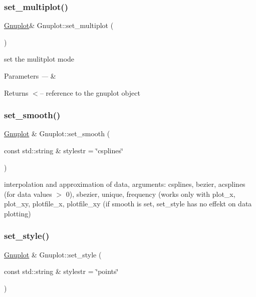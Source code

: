 \subsubsection{\texorpdfstring{set\+\_\+multiplot()}{set\_multiplot()}}
{\footnotesize\ttfamily \mbox{\hyperlink{class_gnuplot}{Gnuplot}}\& Gnuplot\+::set\+\_\+multiplot (\begin{DoxyParamCaption}{ }\end{DoxyParamCaption})\hspace{0.3cm}{\ttfamily [inline]}}

set the mulitplot mode


\begin{DoxyParams}{Parameters}
{\em ---} & \\
\hline
\end{DoxyParams}
\begin{DoxyReturn}{Returns}
$<$-- reference to the gnuplot object 
\end{DoxyReturn}
\mbox{\label{class_gnuplot_aa18386919da2ec4c994f1f9c7195d384}} 
\subsubsection{\texorpdfstring{set\+\_\+smooth()}{set\_smooth()}}
{\footnotesize\ttfamily \mbox{\hyperlink{class_gnuplot}{Gnuplot}} \& Gnuplot\+::set\+\_\+smooth (\begin{DoxyParamCaption}\item[{const std\+::string \&}]{stylestr = {\ttfamily \char`\"{}csplines\char`\"{}} }\end{DoxyParamCaption})}

interpolation and approximation of data, arguments\+: csplines, bezier, acsplines (for data values $>$ 0), sbezier, unique, frequency (works only with plot\+\_\+x, plot\+\_\+xy, plotfile\+\_\+x, plotfile\+\_\+xy (if smooth is set, set\+\_\+style has no effekt on data plotting) \mbox{\label{class_gnuplot_acfdcda292650775ebed4683e8e1515b5}} 
\subsubsection{\texorpdfstring{set\+\_\+style()}{set\_style()}}
{\footnotesize\ttfamily \mbox{\hyperlink{class_gnuplot}{Gnuplot}} \& Gnuplot\+::set\+\_\+style (\begin{DoxyParamCaption}\item[{const std\+::string \&}]{stylestr = {\ttfamily \char`\"{}points\char`\"{}} }\end{DoxyParamCaption})}

